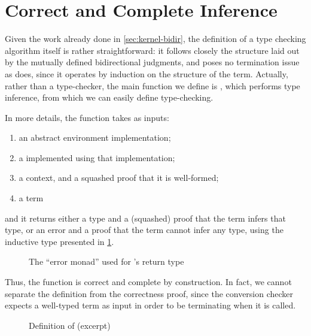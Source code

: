 \section{Correct and Complete Inference}
\label{sec:kernel-typing}

Given the work already done in \cref{sec:kernel-bidir}, the definition of a
type checking algorithm 
itself is rather straightforward: it follows closely
the structure laid out by the mutually defined bidirectional judgments, and
poses no termination issue as  does, since it
operates by induction on the structure of the term.
Actually, rather than a type-checker, the main function we define is
, which performs type inference,%
from which we can easily define type-checking.

In more details, the function takes as inputs:
\begin{enumerate}
  \item an abstract environment implementation;
  \item a  implemented using that implementation;
  \item a context, and a squashed proof that it is well-formed;
  \item a term
\end{enumerate}
and it returns either a type and a (squashed) proof that the term infers that type, or
an error and a proof that the term cannot infer any type, using the inductive type presented in
\cref{fig:meta-error-mon}.
\begin{figure}
  \caption{The “error monad” used for ’s return type}
  \label{fig:meta-error-mon}
\end{figure}
Thus, the function is correct and complete by construction.
In fact, we cannot separate
the definition from the correctness proof, since the conversion checker
expects a well-typed term as input in order to be terminating when it is called.

\begin{figure*}
  \caption{Definition of  (excerpt)}
  \label{fig:meta-infer}
\end{figure*}

